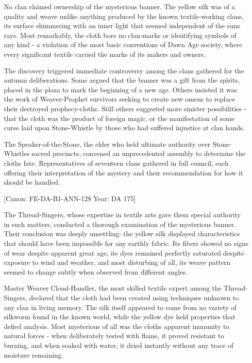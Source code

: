 No clan claimed ownership of the mysterious banner. The yellow silk was
of a quality and weave unlike anything produced by the known
textile-working clans, its surface shimmering with an inner light that
seemed independent of the sun\textquotesingle s rays. Most remarkably,
the cloth bore no clan-marks or identifying symbols of any kind - a
violation of the most basic conventions of Dawn Age society, where every
significant textile carried the marks of its makers and owners.

The discovery triggered immediate controversy among the clans gathered
for the autumn deliberations. Some argued that the banner was a gift
from the spirits, placed in the plaza to mark the beginning of a new
age. Others insisted it was the work of Weaver-Prophet survivors seeking
to create new omens to replace their destroyed prophecy-cloths. Still
others suggested more sinister possibilities - that the cloth was the
product of foreign magic, or the manifestation of some curse laid upon
Stone-Whistle by those who had suffered injustice at clan hands.

The Speaker-of-the-Stone, the elder who held ultimate authority over
Stone-Whistle\textquotesingle s sacred precincts, convened an
unprecedented assembly to determine the cloth\textquotesingle s fate.
Representatives of seventeen clans gathered in full council, each
offering their interpretation of the mystery and their recommendation
for how it should be handled.

{[}Canon: FE-DA-B1-ANN-128 \textbar{} Year: DA 175{]}

The Thread-Singers, whose expertise in textile arts gave them special
authority in such matters, conducted a thorough examination of the
mysterious banner. Their conclusion was deeply unsettling: the yellow
silk displayed characteristics that should have been impossible for any
earthly fabric. Its fibers showed no signs of wear despite apparent
great age, its dyes remained perfectly saturated despite exposure to
wind and weather, and most disturbing of all, its weave pattern seemed
to change subtly when observed from different angles.

Master Weaver Cloud-Handler, the most skilled textile expert among the
Thread-Singers, declared that the cloth had been created using
techniques unknown to any clan in living memory. The silk itself
appeared to come from no variety of silkworm found in the known world,
while the yellow dye held properties that defied analysis. Most
mysterious of all was the cloth\textquotesingle s apparent immunity to
natural forces - when deliberately tested with flame, it proved
resistant to burning, and when soaked with water, it dried instantly
without any trace of moisture remaining.


